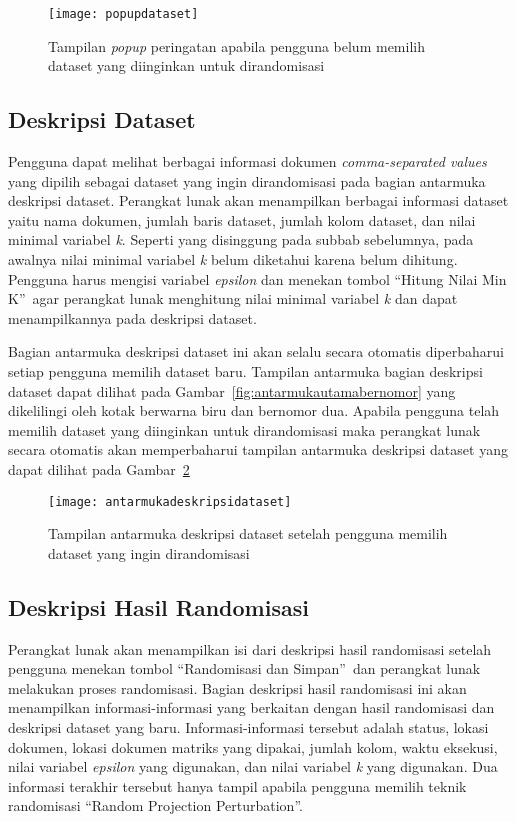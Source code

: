\begin{figure}
	\centering
	\texttt{[image: popupdataset]}
	\caption{Tampilan \textit{popup} peringatan apabila pengguna belum memilih dataset yang diinginkan untuk dirandomisasi}
	\label{fig:popupdataset}
\end{figure}

\subsection{Deskripsi Dataset}
\label{subsec:deskripsidataset}

Pengguna dapat melihat berbagai informasi dokumen \textit{comma-separated values} yang dipilih sebagai dataset yang ingin dirandomisasi pada bagian antarmuka deskripsi dataset. Perangkat lunak akan menampilkan berbagai informasi dataset yaitu nama dokumen, jumlah baris dataset, jumlah kolom dataset, dan nilai minimal variabel \textit{k}. Seperti yang disinggung pada subbab sebelumnya, pada awalnya nilai minimal variabel \textit{k} belum diketahui karena belum dihitung. Pengguna harus mengisi variabel \textit{epsilon} dan menekan tombol \textquotedblleft Hitung Nilai Min K\textquotedblright~agar perangkat lunak menghitung nilai minimal variabel \textit{k} dan dapat menampilkannya pada deskripsi dataset.

Bagian antarmuka deskripsi dataset ini akan selalu secara otomatis diperbaharui setiap pengguna memilih dataset baru. Tampilan antarmuka bagian deskripsi dataset dapat dilihat pada Gambar~\ref{fig:antarmukautamabernomor} yang dikelilingi oleh kotak berwarna biru dan bernomor dua. Apabila pengguna telah memilih dataset yang diinginkan untuk dirandomisasi maka perangkat lunak secara otomatis akan memperbaharui tampilan antarmuka deskripsi dataset yang dapat dilihat pada Gambar~\ref{fig:antarmukadeskripsidataset}

\begin{figure}
	\centering
	\texttt{[image: antarmukadeskripsidataset]}
	\caption{Tampilan antarmuka deskripsi dataset setelah pengguna memilih dataset yang ingin dirandomisasi}
	\label{fig:antarmukadeskripsidataset}
\end{figure}

\subsection{Deskripsi Hasil Randomisasi}
\label{subsec:masukanpengaturan}

Perangkat lunak akan menampilkan isi dari deskripsi hasil randomisasi setelah pengguna menekan tombol \textquotedblleft Randomisasi dan Simpan\textquotedblright~dan perangkat lunak melakukan proses randomisasi. Bagian deskripsi hasil randomisasi ini akan menampilkan informasi-informasi yang berkaitan dengan hasil randomisasi dan deskripsi dataset yang baru. Informasi-informasi tersebut adalah status, lokasi dokumen, lokasi dokumen matriks yang dipakai, jumlah kolom, waktu eksekusi, nilai variabel \textit{epsilon} yang digunakan, dan nilai variabel \textit{k} yang digunakan. Dua informasi terakhir tersebut hanya tampil apabila pengguna memilih teknik randomisasi \textquotedblleft Random Projection Perturbation\textquotedblright.

